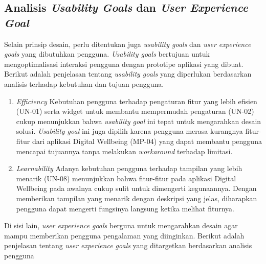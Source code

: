\subsection{Analisis \textit{Usability Goals} dan \textit{User Experience Goal}}
\label{subsec:analisis_goals}

Selain prinsip desain, perlu ditentukan juga \textit{usability goals} dan \textit{user experience goals} yang dibutuhkan pengguna. \textit{Usability goals} bertujuan untuk mengoptimalisasi interaksi pengguna dengan prototipe aplikasi yang dibuat. Berikut adalah penjelasan tentang \textit{usability goals} yang diperlukan berdasarkan analisis terhadap kebutuhan dan tujuan pengguna.

\begin{enumerate}
  \item \textit{Efficiency}
  \subitem Kebutuhan pengguna terhadap pengaturan fitur yang lebih efisien (UN-01) serta widget untuk membantu mempermudah pengaturan (UN-02) cukup menunjukkan bahwa \textit{usability goal} ini tepat untuk mengarahkan desain solusi. \textit{Usability goal} ini juga dipilih karena pengguna merasa kurangnya fitur-fitur dari aplikasi Digital Wellbeing (MP-04) yang dapat membantu pengguna mencapai tujuannya tanpa melakukan \textit{workaround} terhadap limitasi.

  \item \textit{Learnability}
  \subitem Adanya kebutuhan pengguna terhadap tampilan yang lebih menarik (UN-08) menunjukkan bahwa fitur-fitur pada aplikasi Digital Wellbeing pada awalnya cukup sulit untuk dimengerti kegunaannya. Dengan memberikan tampilan yang menarik dengan deskripsi yang jelas, diharapkan pengguna dapat mengerti fungsinya langsung ketika melihat fiturnya.
  
\end{enumerate}

Di sisi lain, \textit{user experience goals} berguna untuk mengarahkan desain agar mampu memberikan pengguna pengalaman yang diinginkan. Berikut adalah penjelasan tentang \textit{user experience goals} yang ditargetkan berdasarkan analisis pengguna

